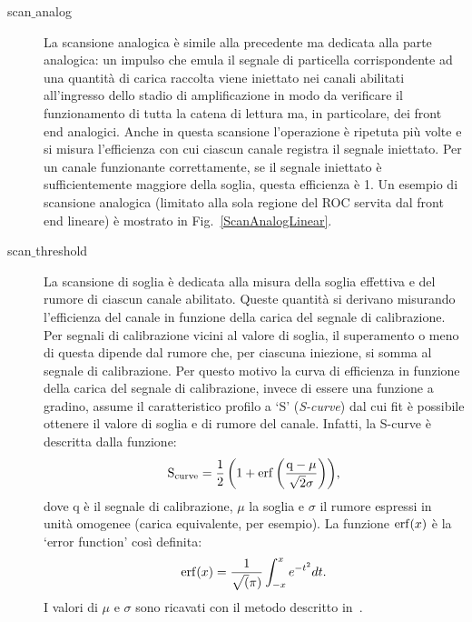\begin{description}
\item[scan$\_$analog] La scansione analogica \`e simile alla precedente ma dedicata alla parte analogica: un impulso che emula il segnale di particella corrispondente ad una quantit\`a di carica raccolta viene iniettato nei canali abilitati all'ingresso dello stadio di amplificazione in modo da verificare il funzionamento di tutta la catena di lettura ma, in particolare, dei front end analogici. Anche in questa scansione l'operazione \`e ripetuta più volte e si misura l'efficienza con cui ciascun canale registra il segnale iniettato. Per un canale funzionante correttamente, se il segnale iniettato \`e sufficientemente maggiore della soglia, questa efficienza \`e 1. Un esempio di scansione analogica (limitato alla sola regione del ROC servita dal front end lineare) è mostrato in Fig.~\ref{ScanAnalogLinear}. %

\item[scan$\_$threshold] La scansione di soglia \`e dedicata alla misura della soglia effettiva e del rumore di ciascun canale abilitato. Queste quantità si derivano misurando l'efficienza del canale in funzione della carica del segnale di calibrazione. Per segnali di calibrazione vicini al valore di soglia, il superamento o meno di questa dipende dal rumore che, per ciascuna iniezione, si somma al segnale di calibrazione. 
Per questo motivo la curva di efficienza in funzione della carica del segnale di calibrazione, invece di essere una funzione a gradino, assume il caratteristico profilo a `S' ({\em S-curve}) dal cui fit \`e possibile ottenere il valore di soglia e di rumore del canale.
Infatti, la S-curve è descritta dalla funzione:
\begin{equation}
  \mathrm{S_{curve} = \frac{1}{2} \left( 1 + \operatorname{erf} \left( \frac{q-\mu}{\sqrt{2}\sigma} \right) \right)},
\end{equation}
dove q \`e il segnale di calibrazione, $\mu$ la soglia e $\sigma$ il rumore espressi in unit\`a omogenee (carica equivalente, per esempio). La funzione $\operatorname{erf}(x)$ \`e la `error function' cos\`i definita:
\begin{equation}
 \operatorname{erf}(x) = \frac{1}{\sqrt(\pi)}\int_{-x}^{x} e^{-t^2}dt.
\end{equation}
I valori di $\mu$ e $\sigma$ sono ricavati con il metodo descritto in~\cite{ERF}.


\end{description}
